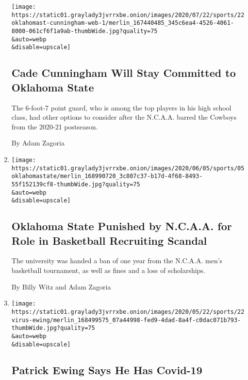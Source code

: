 \begin{enumerate}
  \texttt{[image: https://static01.graylady3jvrrxbe.onion/images/2020/07/22/sports/22oklahomast-cunningham-web-1/merlin\_167440485\_345c6ea4-4526-4061-8000-061cf6f1a9ab-thumbWide.jpg?quality=75\\\&auto=webp\\\&disable=upscale]}

  \hypertarget{cade-cunningham-will-stay-committed-to-oklahoma-state}{%
  \subsection{Cade Cunningham Will Stay Committed to Oklahoma
  State}\label{cade-cunningham-will-stay-committed-to-oklahoma-state}}

  The 6-foot-7 point guard, who is among the top players in his high
  school class, had other options to consider after the N.C.A.A. barred
  the Cowboys from the 2020-21 postseason.

  By Adam Zagoria
\item
  \href{/2020/06/05/sports/ncaabasketball/oklahoma-state-ncaa-punishment.html}{}

  \texttt{[image: https://static01.graylady3jvrrxbe.onion/images/2020/06/05/sports/05oklahomastate/merlin\_168990720\_3c807c37-b17d-4f68-8493-55f152139cf8-thumbWide.jpg?quality=75\\\&auto=webp\\\&disable=upscale]}

  \hypertarget{oklahoma-state-punished-by-ncaa-for-role-in-basketball-recruiting-scandal}{%
  \subsection{Oklahoma State Punished by N.C.A.A. for Role in Basketball
  Recruiting
  Scandal}\label{oklahoma-state-punished-by-ncaa-for-role-in-basketball-recruiting-scandal}}

  The university was handed a ban of one year from the N.C.A.A. men's
  basketball tournament, as well as fines and a loss of scholarships.

  By Billy Witz and Adam Zagoria
\item
  \href{/2020/05/22/sports/basketball/patrick-ewing-coronavirus.html}{}

  \texttt{[image: https://static01.graylady3jvrrxbe.onion/images/2020/05/22/sports/22virus-ewing/merlin\_168499575\_07a44998-fed9-4dad-8a4f-c0dac071b793-thumbWide.jpg?quality=75\\\&auto=webp\\\&disable=upscale]}

  \hypertarget{patrick-ewing-says-he-has-covid-19}{%
  \subsection{Patrick Ewing Says He Has
  Covid-19}\label{patrick-ewing-says-he-has-covid-19}}


\end{enumerate}
